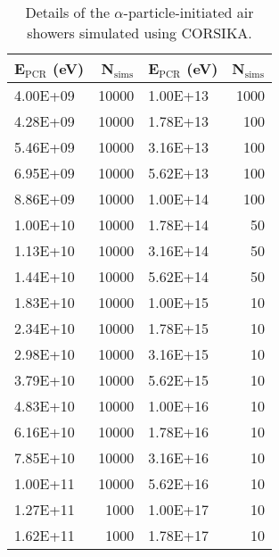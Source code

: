 \begin{table}
	\begin{center}
		\caption{Details of the $\alpha$-particle-initiated air showers simulated using CORSIKA.}
		\label{tab:CORSIKA_alpha_sims}
		\begin{tabular}{l r | l r }%
			\hline
			{\bf E$\bm{_{\mathrm{PCR}}}$ (eV)} & {\bf N$\bm{_{\mathrm{sims}}}$} & {\bf E$\bm{_{\mathrm{PCR}}}$ (eV)} & {\bf N$\bm{_{\mathrm{sims}}}$} \\ %
			\hline
			 4.00E+09    & 10000   & 1.00E+13    & 1000    \\
			 4.28E+09    & 10000   & 1.78E+13    & 100     \\
			 5.46E+09    & 10000   & 3.16E+13    & 100     \\
			 6.95E+09    & 10000   & 5.62E+13    & 100     \\
			 8.86E+09    & 10000   & 1.00E+14    & 100     \\
			 1.00E+10    & 10000   & 1.78E+14    & 50      \\
			 1.13E+10    & 10000   & 3.16E+14    & 50      \\
			 1.44E+10    & 10000   & 5.62E+14    & 50      \\
			 1.83E+10    & 10000   & 1.00E+15    & 10      \\
			 2.34E+10    & 10000   & 1.78E+15    & 10      \\
			 2.98E+10    & 10000   & 3.16E+15    & 10      \\
			 3.79E+10    & 10000   & 5.62E+15    & 10      \\
			 4.83E+10    & 10000   & 1.00E+16    & 10      \\
			 6.16E+10    & 10000   & 1.78E+16    & 10      \\
			 7.85E+10    & 10000   & 3.16E+16    & 10      \\
			 1.00E+11    & 10000   & 5.62E+16    & 10      \\
			 1.27E+11    & 1000    & 1.00E+17    & 10      \\
			 1.62E+11    & 1000    & 1.78E+17    & 10      \\

\end{tabular}
\end{center}
\end{table}
